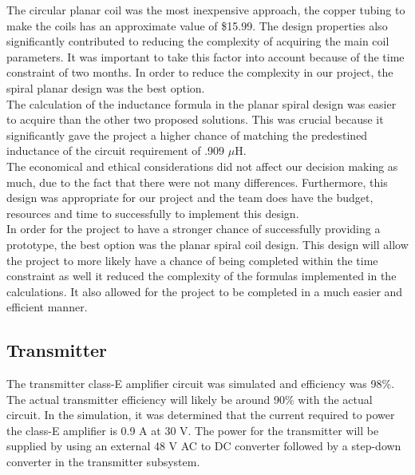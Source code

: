 \documentclass[12pt]{article}
\begin{document}
\indent \indent
The circular planar coil was the most inexpensive approach, the copper tubing to make the coils has an approximate value of  \$15.99. The design properties also significantly contributed to reducing the complexity of acquiring the main coil parameters. It was important to take this factor into account because of the time constraint of two months. In order to reduce the complexity in our project, the spiral planar design was the best option.\\

\indent
The calculation of the inductance formula in the planar spiral design was easier to acquire than the other two proposed solutions. This was crucial because it significantly gave the project a higher chance of matching the predestined inductance of the circuit requirement of .909 $\mu$H.\\

\indent
The economical and ethical considerations did not affect our decision making as much, due to the fact that there were not many differences. Furthermore, this design was appropriate for our project and the team does have the budget, resources and time to successfully to implement this design. \\

\indent
In order for the project to have a stronger chance of successfully providing a prototype, the best option was the planar spiral coil design. This design will allow the project to more likely have a chance of being completed within the time constraint as well it reduced the complexity of the formulas implemented in the calculations. It also allowed for the project to be completed in a much easier and efficient manner.


\subsection{Transmitter}

\indent \indent
The transmitter class-E amplifier circuit was simulated and efficiency was 98\%. The actual transmitter efficiency will likely be around 90\% with the actual circuit. In the simulation, it was determined that the current required to power the class-E amplifier is 0.9 A at 30 V. The power for the transmitter will be supplied by using an external 48 V AC to DC converter followed by a step-down converter in the transmitter subsystem.\\
\end{document}
